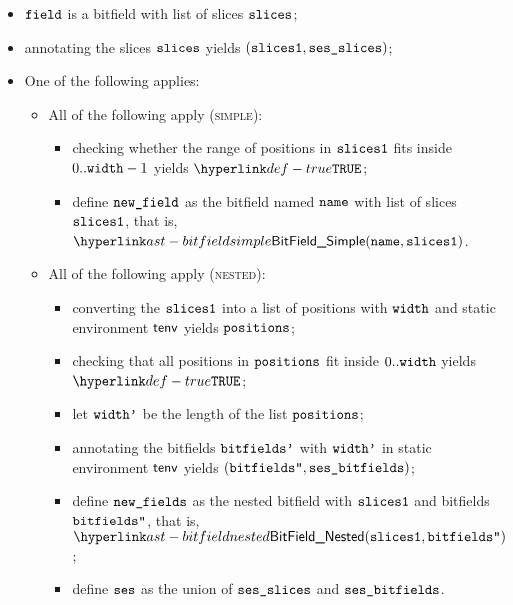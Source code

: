 \begin{itemize}
  \item $\texttt{field}$ is a bitfield with list of slices $\texttt{slices}$;
  \item annotating the slices $\texttt{slices}$ yields $(\texttt{slices1}, \texttt{ses\_slices})$\ProseOrTypeError;
  \item One of the following applies:
  \begin{itemize}
    \item All of the following apply (\textsc{simple}):
    \begin{itemize}
      \item checking whether the range of positions in $\texttt{slices1}$ fits inside $0..\texttt{width}-1$ yields $\True$\ProseOrTypeError;
      \item define $\texttt{new\_field}$ as the bitfield named $\texttt{name}$ with list of slices $\texttt{slices1}$, that is, $\BitFieldSimple(\name, \slicesone)$.
    \end{itemize}

    \item All of the following apply (\textsc{nested}):
    \begin{itemize}
      \item converting the $\texttt{slices1}$ into a list of positions with $\texttt{width}$ and static environment $\textsf{tenv}$
            yields $\texttt{positions}$\ProseOrTypeError;
      \item checking that all positions in $\texttt{positions}$ fit inside $0..\texttt{width}$ yields \\
            $\True$\ProseOrTypeError;
      \item let $\texttt{width'}$ be the length of the list $\texttt{positions}$;
      \item annotating the bitfields $\texttt{bitfields'}$ with $\texttt{width'}$ in static environment $\textsf{tenv}$ yields $ (\texttt{bitfields''}, \texttt{ses\_bitfields})$\ProseOrTypeError;
      \item define $\texttt{new\_fields}$ as the nested bitfield with $\texttt{slices1}$ and bitfields \\
            $\texttt{bitfields''}$, that is, $\BitFieldNested(\slicesone, \bitfieldspp)$;
      \item define $\texttt{ses}$ as the union of $\texttt{ses\_slices}$ and $\texttt{ses\_bitfields}$.
    \end{itemize}


\end{itemize}
\end{itemize}
